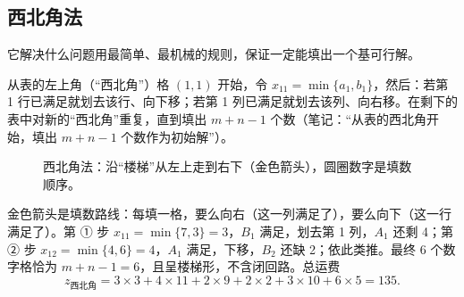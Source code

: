 \subsection{西北角法}
\noindent\textsf{\color{blue2}它解决什么问题}\quad 用最简单、最机械的规则，保证一定能填出一个基可行解。

\begin{definitionbox}
从表的左上角（“西北角”）格 $(1,1)$ 开始，令 $x_{11}=\min\{a_1,b_1\}$，然后：若第 1 行已满足就划去该行、向下移；若第 1 列已满足就划去该列、向右移。在剩下的表中对新的“西北角”重复，直到填出 $m+n-1$ 个数（笔记：“从表的西北角开始，填出 $m+n-1$ 个数作为初始解”）。
\end{definitionbox}

\begin{figure}[H]
\centering
{}
\caption{西北角法：沿“楼梯”从左上走到右下（金色箭头），圆圈数字是填数顺序。}\label{fig:nw}
\end{figure}
金色箭头是填数路线：每填一格，要么向右（这一列满足了），要么向下（这一行满足了）。第 ① 步 $x_{11}=\min\{7,3\}=3$，$B_1$ 满足，划去第 1 列，$A_1$ 还剩 4；第 ② 步 $x_{12}=\min\{4,6\}=4$，$A_1$ 满足，下移，$B_2$ 还缺 2；依此类推。最终 6 个数字格恰为 $m+n-1=6$，且呈楼梯形，不含闭回路。总运费
\[
z_{\text{西北角}}=3\times3+4\times11+2\times9+2\times2+3\times10+6\times5=135.
\]


